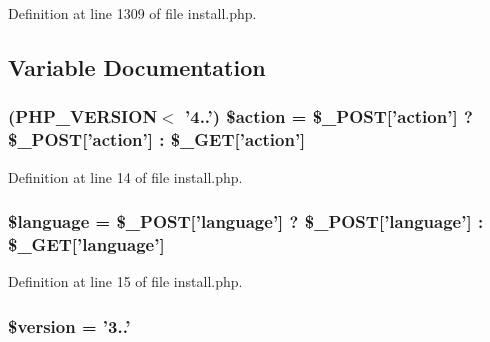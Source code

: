 Definition at line 1309 of file install.\+php.



\subsection{Variable Documentation}
\hypertarget{templates_2install_8php_a3d3de6d509a03feef49787dd457b0f14}{
\subsubsection[{\$action}]{ (P\+H\+P\+\_\+\+V\+E\+R\+S\+I\+O\+N$<$ '4..') \$action = \$\+\_\+\+P\+O\+S\+T\mbox{[}'action'\mbox{]} ? \$\+\_\+\+P\+O\+S\+T\mbox{[}'action'\mbox{]} \+: \$\+\_\+\+G\+E\+T\mbox{[}'action'\mbox{]}}}\label{templates_2install_8php_a3d3de6d509a03feef49787dd457b0f14}


Definition at line 14 of file install.\+php.

\hypertarget{templates_2install_8php_a83170d318260a5a2e2a79dccdd371b10}{
\subsubsection[{\$language}]{\setlength{\rightskip}{0pt plus 5cm}\${\bf language} = \$\+\_\+\+P\+O\+S\+T\mbox{[}'{\bf language}'\mbox{]} ? \$\+\_\+\+P\+O\+S\+T\mbox{[}'{\bf language}'\mbox{]} \+: \$\+\_\+\+G\+E\+T\mbox{[}'{\bf language}'\mbox{]}}}\label{templates_2install_8php_a83170d318260a5a2e2a79dccdd371b10}


Definition at line 15 of file install.\+php.

\hypertarget{templates_2install_8php_a17c8948c68aa44fa9961ae169b6a8961}{
\subsubsection[{\$version}]{\setlength{\rightskip}{0pt plus 5cm}\$version = '3..'}}\label{templates_2install_8php_a17c8948c68aa44fa9961ae169b6a8961}



